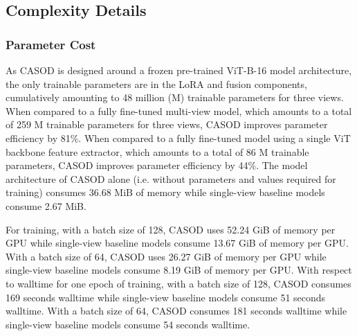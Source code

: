 \subsection{Complexity Details}
\label{sec:casod_suppmat-runtime}

\subsubsection{Parameter Cost}
As CASOD is designed around a frozen pre-trained ViT-B-16 model architecture, the only trainable parameters are in the LoRA and fusion components, cumulatively amounting to 48 million (M) trainable parameters for three views. When compared to a fully fine-tuned multi-view model, which amounts to a total of 259 M trainable parameters for three views, CASOD improves parameter efficiency by 81\%. When compared to a fully fine-tuned model using a single ViT backbone feature extractor, which amounts to a total of 86 M trainable parameters, CASOD improves parameter efficiency by 44\%. The model architecture of CASOD alone (i.e. without parameters and values required for training) consumes 36.68 MiB of memory while single-view baseline models consume 2.67 MiB.

For training, with a batch size of 128, CASOD uses 52.24 GiB of memory per GPU while single-view baseline models consume 13.67 GiB of memory per GPU. With a batch size of 64, CASOD uses 26.27 GiB of memory per GPU while single-view baseline models consume 8.19 GiB of memory per GPU. With respect to walltime for one epoch of training, with a batch size of 128, CASOD consumes 169 seconds walltime while single-view baseline models consume 51 seconds walltime. With a batch size of 64, CASOD consumes 181 seconds walltime while single-view baseline models consume 54 seconds walltime.



